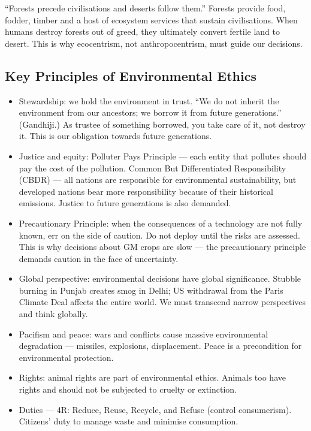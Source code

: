 \begin{PYQLink}
``Forests precede civilisations and deserts follow them.'' Forests provide food, fodder, timber and a host of ecosystem services that sustain civilisations. When humans destroy forests out of greed, they ultimately convert fertile land to desert. This is why ecocentrism, not anthropocentrism, must guide our decisions.
\end{PYQLink}

\subsection{Key Principles of Environmental Ethics}

\begin{itemize}
\item Stewardship: we hold the environment in trust. ``We do not inherit the environment from our ancestors; we borrow it from future generations.'' (Gandhiji.) As trustee of something borrowed, you take care of it, not destroy it. This is our obligation towards future generations.
\item Justice and equity: Polluter Pays Principle --- each entity that pollutes should pay the cost of the pollution. Common But Differentiated Responsibility (CBDR) --- all nations are responsible for environmental sustainability, but developed nations bear more responsibility because of their historical emissions. Justice to future generations is also demanded.
\item Precautionary Principle: when the consequences of a technology are not fully known, err on the side of caution. Do not deploy until the risks are assessed. This is why decisions about GM crops are slow --- the precautionary principle demands caution in the face of uncertainty.
\item Global perspective: environmental decisions have global significance. Stubble burning in Punjab creates smog in Delhi; US withdrawal from the Paris Climate Deal affects the entire world. We must transcend narrow perspectives and think globally.
\item Pacifism and peace: wars and conflicts cause massive environmental degradation --- missiles, explosions, displacement. Peace is a precondition for environmental protection.
\item Rights: animal rights are part of environmental ethics. Animals too have rights and should not be subjected to cruelty or extinction.
\item Duties --- 4R: Reduce, Reuse, Recycle, and Refuse (control consumerism). Citizens' duty to manage waste and minimise consumption.
\end{itemize}

